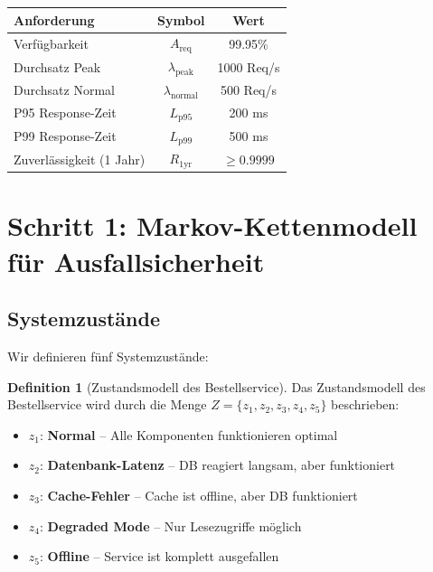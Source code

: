 \documentclass[a4paper,11pt]{article}
\theoremstyle{definition}
\newtheorem{definition}{Definition}
\begin{document}
\begin{table}[H]
    \centering
    \begin{tabular}{|l|c|c|}
        \hline
        \textbf{Anforderung} & \textbf{Symbol} & \textbf{Wert} \\
        \hline
        Verfügbarkeit & $A_{\text{req}}$ & 99.95\% \\
        Durchsatz Peak & $\lambda_{\text{peak}}$ & 1000 Req/s \\
        Durchsatz Normal & $\lambda_{\text{normal}}$ & 500 Req/s \\
        P95 Response-Zeit & $L_{\text{p95}}$ & 200 ms \\
        P99 Response-Zeit & $L_{\text{p99}}$ & 500 ms \\
        Zuverlässigkeit (1 Jahr) & $R_{\text{1yr}}$ & $\geq 0.9999$ \\
        \hline
    \end{tabular}
\end{table}

\section{Schritt 1: Markov-Kettenmodell für Ausfallsicherheit}

\subsection{Systemzustände}

Wir definieren fünf Systemzustände:

\begin{definition}[Zustandsmodell des Bestellservice] Das Zustandsmodell des Bestellservice wird durch die Menge $Z = \{z_1, z_2, z_3, z_4, z_5\}$ beschrieben:
    \label{def:order_service_states}
    
    \begin{itemize}
        \item $z_1$: \textbf{Normal} -- Alle Komponenten funktionieren optimal
        \item $z_2$: \textbf{Datenbank-Latenz} -- DB reagiert langsam, aber funktioniert
        \item $z_3$: \textbf{Cache-Fehler} -- Cache ist offline, aber DB funktioniert
        \item $z_4$: \textbf{Degraded Mode} -- Nur Lesezugriffe möglich
        \item $z_5$: \textbf{Offline} -- Service ist komplett ausgefallen
    \end{itemize}
\end{definition}
\end{document}

